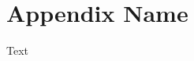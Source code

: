 \documentclass[journal]{IEEEtran}
\begin{document}
%
\appendices{}
\section{Appendix Name}
Text

\printbibliography{}
\end{document}
